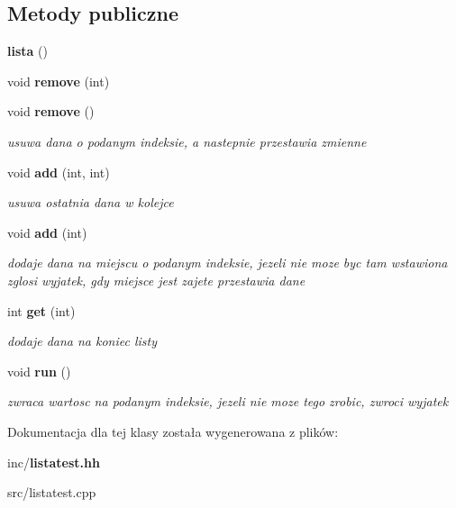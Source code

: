 \subsection*{Metody publiczne}
\begin{DoxyCompactItemize}
\item 
{\bfseries lista} ()\label{classlistatest_ab68d3f591f7919c48ff11ecc954e5bfc}

\item 
void {\bfseries remove} (int)\label{classlistatest_a72670c086c60d2f5eb907021b08f6832}

\item 
void {\bf remove} ()\label{classlistatest_a68f3e4576befef3f0c87d0d267b62607}

\begin{DoxyCompactList}\small\item\em usuwa dana o podanym indeksie, a nastepnie przestawia zmienne \end{DoxyCompactList}\item 
void {\bf add} (int, int)\label{classlistatest_a5f0649c070d004ba76f9107228e610fb}

\begin{DoxyCompactList}\small\item\em usuwa ostatnia dana w kolejce \end{DoxyCompactList}\item 
void {\bf add} (int)\label{classlistatest_af7049706d52168c353a6cdf7f5df23b7}

\begin{DoxyCompactList}\small\item\em dodaje dana na miejscu o podanym indeksie, jezeli nie moze byc tam wstawiona zglosi wyjatek, gdy miejsce jest zajete przestawia dane \end{DoxyCompactList}\item 
int {\bf get} (int)\label{classlistatest_ac6e515602f13c5a8823e45eeef948f01}

\begin{DoxyCompactList}\small\item\em dodaje dana na koniec listy \end{DoxyCompactList}\item 
void {\bf run} ()\label{classlistatest_a60205347050d77d5a1f224b3543395b7}

\begin{DoxyCompactList}\small\item\em zwraca wartosc na podanym indeksie, jezeli nie moze tego zrobic, zwroci wyjatek \end{DoxyCompactList}\end{DoxyCompactItemize}


Dokumentacja dla tej klasy została wygenerowana z plików\+:\begin{DoxyCompactItemize}
\item 
inc/{\bf listatest.\+hh}\item 
src/listatest.\+cpp\end{DoxyCompactItemize}
